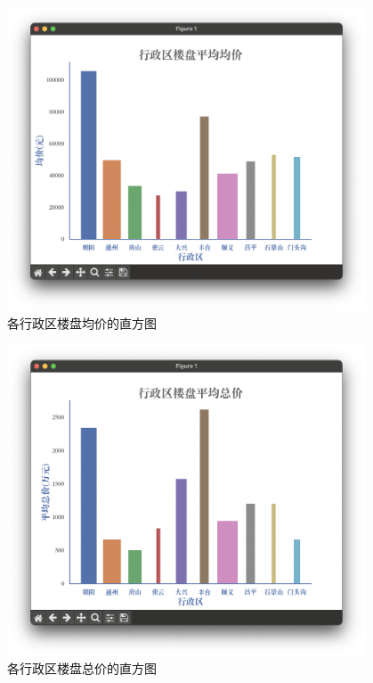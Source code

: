 \begin{figure}[ht!]
    \begin{center}
        \includegraphics[width=0.95\textwidth]{figures/bar-avg.png}
    \end{center}
    \caption{各行政区楼盘均价的直方图}
    \label{fig:各行政区楼盘均价的直方图}
\end{figure}

\begin{figure}[ht!]
    \begin{center}
        \includegraphics[width=0.95\textwidth]{figures/bar-total.png}
    \end{center}
    \caption{各行政区楼盘总价的直方图}
    \label{fig:各行政区楼盘总价的直方图}
\end{figure}

